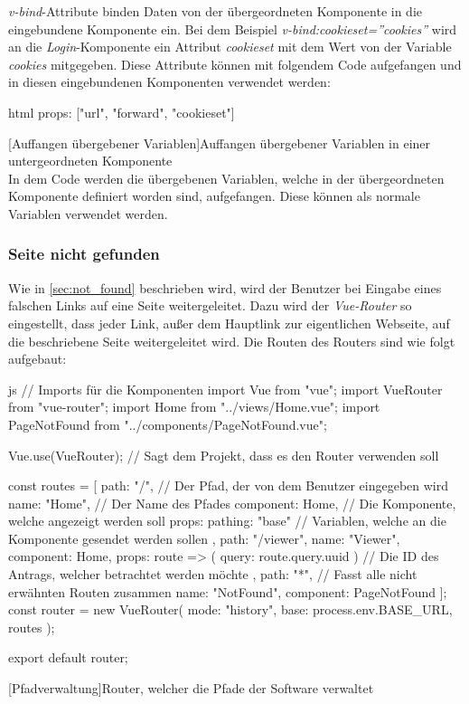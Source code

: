 \textit{v-bind}-Attribute binden Daten von der übergeordneten Komponente in die eingebundene Komponente ein. Bei dem Beispiel \textit{v-bind:cookieset=''cookies''} wird an die \textit{Login}-Komponente ein Attribut \textit{cookieset} mit dem Wert von der Variable \textit{cookies} mitgegeben.
Diese Attribute können mit folgendem Code aufgefangen und in diesen eingebundenen Komponenten verwendet werden:
\begin{code}{html}
		props: ["url", "forward", "cookieset"]
\end{code}
[Auffangen übergebener Variablen]{Auffangen übergebener Variablen in einer untergeordneten Komponente}~\\
In dem Code werden die übergebenen Variablen, welche in der übergeordneten Komponente definiert worden sind, aufgefangen. Diese können als normale Variablen verwendet werden.
\newpage
\subsubsection{Seite nicht gefunden}
Wie in \autoref{sec:not_found} beschrieben wird, wird der Benutzer bei Eingabe eines falschen Links auf eine Seite weitergeleitet. Dazu wird der \textit{Vue-Router} so eingestellt, dass jeder Link, außer dem Hauptlink zur eigentlichen Webseite, auf die beschriebene Seite weitergeleitet wird. Die Routen des Routers sind wie folgt aufgebaut:
\begin{code}{js}
// Imports für die Komponenten
import Vue from "vue";
import VueRouter from "vue-router";
import Home from "../views/Home.vue";
import PageNotFound from "../components/PageNotFound.vue";

Vue.use(VueRouter);		// Sagt dem Projekt, dass es den Router verwenden soll

const routes = [
{
	path: "/",					// Der Pfad, der von dem Benutzer eingegeben wird
	name: "Home",				// Der Name des Pfades
	component: Home,			// Die Komponente, welche angezeigt werden soll
	props: { pathing: "base" }	// Variablen, welche an die Komponente gesendet werden sollen
},
{
	path: "/viewer",
	name: "Viewer",
	component: Home,
	props: route => ({ query: route.query.uuid })	// Die ID des Antrags, welcher betrachtet werden möchte
},
{
	path: "*",				// Fasst alle nicht erwähnten Routen zusammen
	name: "NotFound",
	component: PageNotFound
}
];
const router = new VueRouter({
	mode: "history",
	base: process.env.BASE_URL,
	routes
});

export default router;
\end{code}
[Pfadverwaltung]{Router, welcher die Pfade der Software verwaltet}~\\

